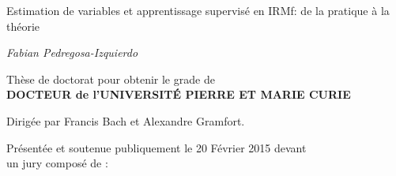 \documentclass[nobib, a4paper, notoc, twoside, justified]{tufte-book}
\begin{document}
\begin{titlepage}
\begin{fullwidth}
\begin{center}

\vspace{10pt}



\vspace{2pc}
{ \Huge
{\color{msblue} {Estimation de variables et apprentissage supervisé en IRMf: de la pratique à la théorie}} \\[0.5cm]
}




\vspace{3pc}
{\Huge \it Fabian Pedregosa-Izquierdo} \\

\vspace{3pc}



{\LARGE Thèse de doctorat pour obtenir le grade de \ \\[1ex]
{\bf DOCTEUR de l'UNIVERSIT\'E PIERRE ET MARIE CURIE} \ \\
}
\vspace{1pc}

{\LARGE Dirig\'ee par {Francis Bach} et {Alexandre Gramfort}.}

\vspace{1pc}


{\LARGE Présentée et soutenue publiquement le 20 Février 2015 devant \\ \vspace{10pt} un jury composé de :}

\vspace{1pc}



\end{center}
\end{fullwidth}
\end{titlepage}
\end{document}
